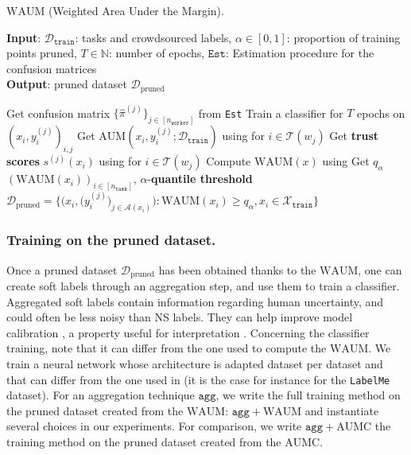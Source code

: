 \begin{algorithm}[tb]
\caption{$\mathrm{WAUM}$ (Weighted Area Under the Margin).}
\label{alg:WAUMstack}
\textbf{Input}:  $\mathcal{D}_{\texttt{train}}$: tasks and crowdsourced labels, $\alpha\in[0,1]$: proportion of training points pruned, $T\in \mathbb{N}$: number of epochs, $\texttt{Est}$: Estimation procedure for the confusion matrices\\
\textbf{Output}: pruned dataset $\mathcal{D}_{\text{pruned}}$
\begin{algorithmic}[1]
\STATE Get confusion matrix $\{\hat{\pi}^{(j)}\}_{j\in[n_\texttt{worker}]}$ from \texttt{Est}
\STATE Train a classifier for $T$ epochs on $\left(x_i, y_i^{(j)}\right)_{i,j}$
\STATE Get $\mathrm{AUM}(x_i, y_i^{(j)}; \mathcal{D}_{\texttt{train}})$ using  for $i\in\mathcal{T}(w_j)$
\STATE Get \textbf{trust scores} $s^{(j)}(x_i)$ using  for $i\in\mathcal{T}(w_j)$
\ENDFOR
{}
\STATE Compute $\mathrm{WAUM}(x)$ using \;
\ENDFOR
\STATE  Get $q_{\alpha}$ $(\mathrm{WAUM}(x_i))_{i\in[n_\texttt{task}]}$, $\alpha$-\textbf{quantile threshold}
\STATE $\mathcal{D}_{\text{pruned}}\!=\!
        \Big\{
        \big( x_i, \big(y_i^{(j)}\big)_{j\in\mathcal{A}(x_i)}\big) \! : \!\mathrm{WAUM}(x_i) \geq q_\alpha,  x_i \in \mathcal{X}_\texttt{train}  \Big
        \}$
\end{algorithmic}
\end{algorithm}

\subsubsection{Training on the pruned dataset.}
Once a pruned dataset $\mathcal{D}_{\text{pruned}}$ has been obtained thanks to the $\mathrm{WAUM}$, one can create soft labels through an aggregation step, and use them to train a classifier.
Aggregated soft labels contain information regarding human uncertainty, and could often be less noisy than NS labels.
They can help improve model calibration \citep{wen2020combining, zhong2021improving}, a property useful for interpretation \citep{jiang2012calibrating, kumar2019verified}.
Concerning the classifier training, note that it can differ from the one used to compute the $\mathrm{WAUM}$.
We train a neural network whose architecture is adapted dataset per dataset and that can differ from the one used in  (it is the case for instance for the \texttt{LabelMe} dataset).
For an aggregation technique $\texttt{agg}$, we write the full training method on the pruned dataset created from the $\mathrm{WAUM}$: $\texttt{agg}+\mathrm{WAUM}$ and instantiate several choices in our experiments.
For comparison, we write $\texttt{agg} + \mathrm{AUMC}$ the training method on the pruned dataset created from the $\mathrm{AUMC}$.

